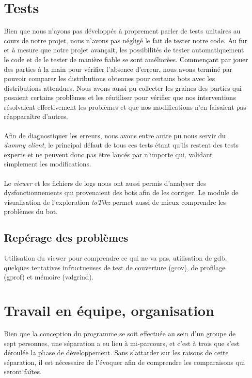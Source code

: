 \documentclass[a4paper,12pt]{article}
\begin{document}
\section{Tests}
Bien que nous n'ayons pas développés à proprement parler de tests unitaires au
cours de notre projet, nous n'avons pas négligé le fait de tester notre code. Au
fur et à mesure que notre projet avançait, les possibilités de tester
automatiquement le code et de le tester de manière fiable se sont améliorées.
Commençant par jouer des parties à la main pour vérifier l'absence d'erreur,
nous avons terminé par pouvoir comparer les distributions obtenues pour certains
bots avec les distributions attendues. Nous avons aussi pu collecter les graines
des parties qui posaient certains problèmes et les réutiliser pour vérifier que
nos interventions résolvaient effectivement les problèmes et que nos
modifications n'en faisaient pas réapparaître d'autres.
\paragraph{}
Afin de diagnostiquer les erreurs, nous avons entre autre pu nous servir du
{\em dummy client}, le principal défaut de tous ces tests étant qu'ils restent
des tests experts et ne peuvent donc pas être lancés par n'importe qui, validant
simplement les modifications.
\paragraph{}
Le {\em viewer} et les fichiers de logs nous ont aussi permis d'analyser des
dysfonctionnements qui provenaient des bots afin de les corriger. Le module de
visualisation de l'exploration {\em toTikz} permet aussi de mieux comprendre les
problèmes du bot.

\subsection*{Repérage des problèmes}
Utilisation du viewer pour comprendre ce qui ne va pas, utilisation de gdb,
quelques tentatives infructueuses de test de couverture (gcov), de profilage
(gprof) et mémoire (valgrind).

\section{Travail en équipe, organisation}

Bien que la conception du programme se soit effectuée au sein d'un groupe
de sept personnes, une séparation a eu lieu à mi-parcours, et c'est à trois que
s'est déroulée la phase de développement. Sans s'attarder sur les raisons de
cette séparation, il est nécessaire de l'évoquer afin de comprendre les
comparaisons qui seront faîtes.
\end{document}
